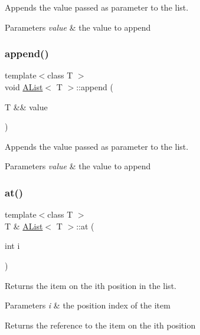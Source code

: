 Appends the value passed as parameter to the list. 


\begin{DoxyParams}{Parameters}
{\em value} & the value to append \\
\hline
\end{DoxyParams}
\mbox{\label{class_a_list_ac8e33a3962d74310ebafc8d99be5437a}} 
\subsubsection{\texorpdfstring{append()}{append()}\hspace{0.1cm}{\footnotesize\ttfamily [2/2]}}
{\footnotesize\ttfamily template$<$class T $>$ \\
void \mbox{\hyperlink{class_a_list}{A\+List}}$<$ T $>$\+::append (\begin{DoxyParamCaption}\item[{T \&\&}]{value }\end{DoxyParamCaption})}



Appends the value passed as parameter to the list. 


\begin{DoxyParams}{Parameters}
{\em value} & the value to append \\
\hline
\end{DoxyParams}
\mbox{\label{class_a_list_ae43013270783ff87b26c3dc559874681}} 
\subsubsection{\texorpdfstring{at()}{at()}\hspace{0.1cm}{\footnotesize\ttfamily [1/2]}}
{\footnotesize\ttfamily template$<$class T $>$ \\
T \& \mbox{\hyperlink{class_a_list}{A\+List}}$<$ T $>$\+::at (\begin{DoxyParamCaption}\item[{int}]{i }\end{DoxyParamCaption})}



Returns the item on the ith position in the list. 


\begin{DoxyParams}{Parameters}
{\em i} & the position index of the item \\
\hline
\end{DoxyParams}
\begin{DoxyReturn}{Returns}
the reference to the item on the ith position 
\end{DoxyReturn}
\mbox{\label{class_a_list_a10107fe182383d368c18992eb5be7127}} 
